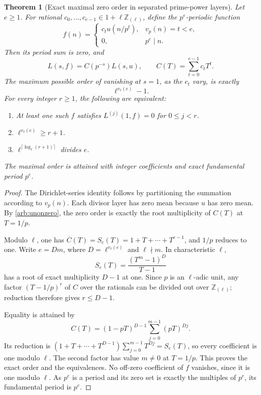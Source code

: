 \documentclass[11pt,a4paper]{article}
\newtheorem{theorem}{Theorem}[section]
\theoremstyle{definition}
\theoremstyle{remark}
\numberwithin{equation}{section}
\begin{document}
\begin{theorem}[Exact maximal zero order in separated prime-power layers]
\label{arb:separated}
Let \(e\geq1\).  For rational
\(c_0,\ldots,c_{e-1}\in1+\ell\mathbb Z_{(\ell)}\), define the
\(p^e\)-periodic function
\[
 f(n)=
 \begin{cases}
 c_tu(n/p^t),&v_p(n)=t<e,\\
 0,&p^e\mid n.
 \end{cases}
\]
Then its period sum is zero, and
\[
 L(s,f)=C(p^{-s})L(s,u),\qquad
 C(T)=\sum_{t=0}^{e-1}c_tT^t.
\]
The maximum possible order of vanishing at \(s=1\), as the
\(c_t\) vary, is exactly
\begin{equation}\label{arb:maxorder}
             \ell^{v_\ell(e)}-1.
\end{equation}
For every integer \(r\geq1\), the following are equivalent:
\begin{enumerate}
\item At least one such \(f\) satisfies \(L^{(j)}(1,f)=0\) for
      \(0\leq j<r\).
\item \(\ell^{v_\ell(e)}\geq r+1\).
\item \(\ell^{\lceil\log_\ell(r+1)\rceil}\) divides \(e\).
\end{enumerate}
The maximal order is attained with integer coefficients and exact
fundamental period \(p^e\).
\end{theorem}

\begin{proof}
The Dirichlet-series identity follows by partitioning the summation
according to \(v_p(n)\).  Each divisor layer has zero mean because
\(u\) has zero mean.  By \eqref{arb:unonzero}, the zero order is
exactly the root multiplicity of \(C(T)\) at \(T=1/p\).

Modulo \(\ell\), one has
\(\overline C(T)=S_e(T)=1+T+\cdots+T^{e-1}\), and \(1/p\)
reduces to one.  Write \(e=Dm\), where
\(D=\ell^{v_\ell(e)}\) and \(\ell\nmid m\).
In characteristic \(\ell\),
\[
 S_e(T)=\frac{(T^m-1)^D}{T-1}
\]
has a root of exact multiplicity \(D-1\) at one.
Since \(p\) is an \(\ell\)-adic unit, any factor
\((T-1/p)^r\) of \(C\) over the rationals can be divided out
over \(\mathbb Z_{(\ell)}\); reduction therefore gives
\(r\leq D-1\).

Equality is attained by
\begin{equation}\label{arb:attainer}
 C(T)=(1-pT)^{D-1}\sum_{j=0}^{m-1}(pT)^{Dj}.
\end{equation}
Its reduction is
\((1+T+\cdots+T^{D-1})\sum_{j=0}^{m-1}T^{Dj}=S_e(T)\),
so every coefficient is one modulo \(\ell\).
The second factor has value \(m\ne0\) at \(T=1/p\).
This proves the exact order and the equivalences.
No off-zero coefficient of \(f\) vanishes, since it is one
modulo \(\ell\).  As \(p^e\) is a period and its zero set is
exactly the multiples of \(p^e\), its fundamental period is
\(p^e\).
\end{proof}
\end{document}
